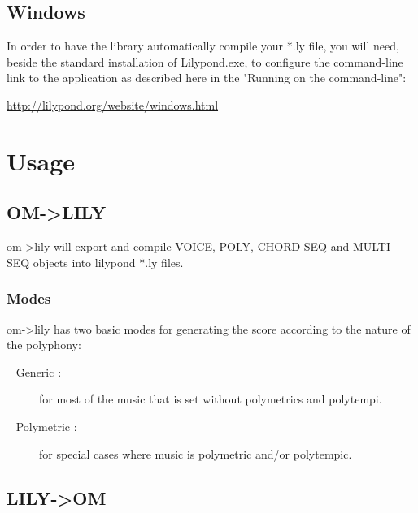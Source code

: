 \documentclass{article}
\let\urlorig\url
\renewcommand{\url}[1]{%
  \begin{otherlanguage}{english}\urlorig{#1}\end{otherlanguage}%
}
\begin{document}
\subsection{Windows}


In order to have the library automatically compile your *.ly file, you will need, beside the standard installation of Lilypond.exe, to configure the command-line link to the application as described here in the "Running on the command-line": \url{http://lilypond.org/website/windows.html}



\section{Usage}



\subsection{OM->LILY}

om->lily will export and compile VOICE, POLY, CHORD-SEQ and MULTI-SEQ objects into lilypond *.ly files.

\subsubsection{Modes}
om->lily has two basic modes for generating the score according to the nature of the polyphony:

\begin{description}
   \item [\textbullet~ Generic :] for most of the music that is set without polymetrics and polytempi.
   \item [\textbullet~ Polymetric :] for special cases where music is polymetric and/or polytempic. 
\end{description}




\subsection{LILY->OM}
\end{document}
